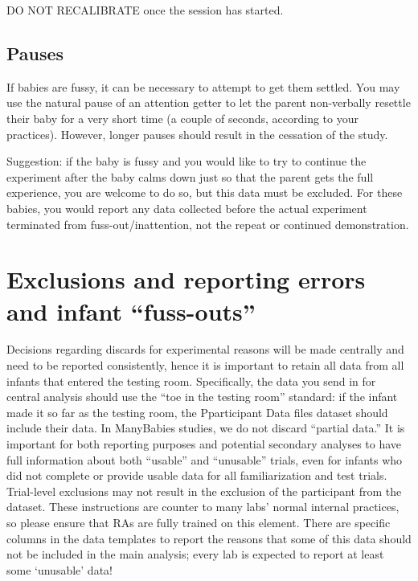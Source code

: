 \documentclass[
  letterpaper,
  DIV=11,
  numbers=noendperiod,
  oneside]{scrreprt}
\begin{document}
DO NOT RECALIBRATE once the session has started.

\subsection{Pauses}\label{pauses}

If babies are fussy, it can be necessary to attempt to get them settled.
You may use the natural pause of an attention getter to let the parent
non-verbally resettle their baby for a very short time (a couple of
seconds, according to your practices). However, longer pauses should
result in the cessation of the study.

Suggestion: if the baby is fussy and you would like to try to continue
the experiment after the baby calms down just so that the parent gets
the full experience, you are welcome to do so, but this data must be
excluded. For these babies, you would report any data collected before
the actual experiment terminated from fuss-out/inattention, not the
repeat or continued demonstration.

\section{Exclusions and reporting errors and infant
``fuss-outs''}\label{exclusions-and-reporting-errors-and-infant-fuss-outs}

Decisions regarding discards for experimental reasons will be made
centrally and need to be reported consistently, hence it is important to
retain all data from all infants that entered the testing room.
Specifically, the data you send in for central analysis should use the
``toe in the testing room'' standard: if the infant made it so far as
the testing room, the Pparticipant Data files dataset should include
their data. In ManyBabies studies, we do not discard ``partial data.''
It is important for both reporting purposes and potential secondary
analyses to have full information about both ``usable'' and ``unusable''
trials, even for infants who did not complete or provide usable data for
all familiarization and test trials. Trial-level exclusions may not
result in the exclusion of the participant from the dataset. These
instructions are counter to many labs' normal internal practices, so
please ensure that RAs are fully trained on this element. There are
specific columns in the data templates to report the reasons that some
of this data should not be included in the main analysis; every lab is
expected to report at least some `unusable' data!
\end{document}
